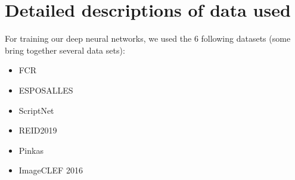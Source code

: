\documentclass{polytech/polytech}
\numberwithin{figure}{chapter}
\begin{document}
\begin{appendix}
\label{dataPrep}

\section{Detailed descriptions of data used}

For training our deep neural networks, we used the 6 following datasets (some bring together several data sets):
\begin{itemize}
\item FCR
\item ESPOSALLES
\item ScriptNet
\item REID2019
\item Pinkas
\item ImageCLEF 2016
\end{itemize}


\end{appendix}
\end{document}
